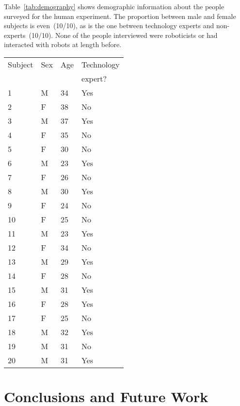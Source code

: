 Table~\ref{tab:demography} shows demographic information about the people surveyed for the human experiment. The proportion between male and female subjects is even~(10/10), as is the one between technology experts and non-experts~(10/10). None of the people interviewed were roboticists or had interacted with robots at length before.

\begin{table*}
\centering
\caption{Demographic data of people surveyed.}
\begin{tabular}{*{4}{l}} %
\toprule
Subject & Sex & Age & Technology \\
        &     &     & expert? \\
\midrule
 1 & M & 34 & Yes \\
 2 & F & 38 & No \\
 3 & M & 37 & Yes \\
 4 & F & 35 & No \\
 5 & F & 30 & No \\
%
 6 & M & 23 & Yes \\
 7 & F & 26 & No \\
%
 8 & M & 30 & Yes \\
 9 & F & 24 & No \\
%
10 & F & 25 & No \\
11 & M & 23 & Yes \\
12 & F & 34 & No \\
%
13 & M & 29 & Yes \\
14 & F & 28 & No \\
15 & M & 31 & Yes \\
%
16 & F & 28 & Yes \\
17 & F & 25 & No \\
18 & M & 32 & Yes \\
19 & M & 31 & No \\
%
20 & M & 31 & Yes \\
\bottomrule
\end{tabular}
\label{tab:demography}
\end{table*}

\section{Conclusions and Future Work}
\label{sec:human_perc_robotgest:conclusions}


